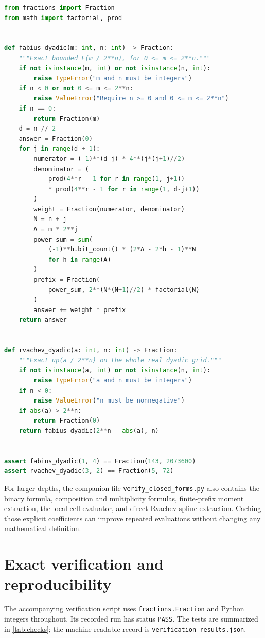 \documentclass[11pt,a4paper]{article}
\numberwithin{equation}{section}
\theoremstyle{definition}
\theoremstyle{remark}
\begin{document}
\begin{lstlisting}[language=Python]
from fractions import Fraction
from math import factorial, prod


def fabius_dyadic(m: int, n: int) -> Fraction:
    """Exact bounded F(m / 2**n), for 0 <= m <= 2**n."""
    if not isinstance(m, int) or not isinstance(n, int):
        raise TypeError("m and n must be integers")
    if n < 0 or not 0 <= m <= 2**n:
        raise ValueError("Require n >= 0 and 0 <= m <= 2**n")
    if n == 0:
        return Fraction(m)
    d = n // 2
    answer = Fraction(0)
    for j in range(d + 1):
        numerator = (-1)**(d-j) * 4**(j*(j+1)//2)
        denominator = (
            prod(4**r - 1 for r in range(1, j+1))
            * prod(4**r - 1 for r in range(1, d-j+1))
        )
        weight = Fraction(numerator, denominator)
        N = n + j
        A = m * 2**j
        power_sum = sum(
            (-1)**h.bit_count() * (2*A - 2*h - 1)**N
            for h in range(A)
        )
        prefix = Fraction(
            power_sum, 2**(N*(N+1)//2) * factorial(N)
        )
        answer += weight * prefix
    return answer


def rvachev_dyadic(a: int, n: int) -> Fraction:
    """Exact up(a / 2**n) on the whole real dyadic grid."""
    if not isinstance(a, int) or not isinstance(n, int):
        raise TypeError("a and n must be integers")
    if n < 0:
        raise ValueError("n must be nonnegative")
    if abs(a) > 2**n:
        return Fraction(0)
    return fabius_dyadic(2**n - abs(a), n)


assert fabius_dyadic(1, 4) == Fraction(143, 2073600)
assert rvachev_dyadic(3, 2) == Fraction(5, 72)
\end{lstlisting}

For larger depths, the companion file \texttt{verify\_closed\_forms.py} also contains the binary formula, composition and multiplicity formulas, finite-prefix moment extraction, the local-cell evaluator, and direct Rvachev spline extraction. Caching those explicit coefficients can improve repeated evaluations without changing any mathematical definition.

\section{Exact verification and reproducibility}
\label{app:verification}

The accompanying verification script uses \texttt{fractions.Fraction} and Python integers throughout. Its recorded run has status \texttt{PASS}. The tests are summarized in \cref{tab:checks}; the machine-readable record is \texttt{verification\_results.json}.
\end{document}
